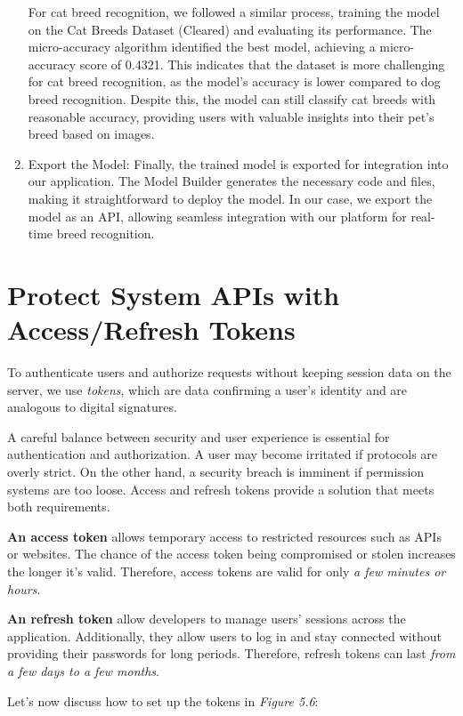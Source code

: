 \begin{enumerate}
    For cat breed recognition, we followed a similar process, training the model on the Cat Breeds Dataset (Cleared)
    and evaluating its performance. The micro-accuracy algorithm identified the best model, achieving a micro-accuracy
    score of 0.4321. This indicates that the dataset is more challenging for cat breed recognition, as the model's accuracy
    is lower compared to dog breed recognition. Despite this, the model can still classify cat breeds with reasonable accuracy,
    providing users with valuable insights into their pet's breed based on images. 

    \item Export the Model: Finally, the trained model is exported for integration into our application. 
    The Model Builder generates the necessary code and files, making it straightforward to deploy the model.
    In our case, we export the model as an API, allowing seamless integration with our platform for real-time breed recognition.
\end{enumerate}

\section{Protect System APIs with Access/Refresh Tokens}
To authenticate users and authorize requests without keeping session data on the server, we use \textit{tokens}, which are data confirming a user’s identity and are analogous to digital signatures.

A careful balance between security and user experience is essential for authentication and authorization. A user may become irritated if protocols are overly strict. On the other hand, a security breach is imminent if permission systems are too loose. Access and refresh tokens provide a solution that meets both requirements.

\textbf{An access token} allows temporary access to restricted resources such as APIs or websites. The chance of the access token being compromised or stolen increases the longer it’s valid. Therefore, access tokens are valid for only \textit{a few minutes or hours}.

\textbf{An refresh token} allow developers to manage users’ sessions across the application. Additionally, they allow users to log in and stay connected without providing their passwords for long periods. Therefore, refresh tokens can last \textit{from a few days to a few months}.

Let’s now discuss how to set up the tokens in \textit{Figure 5.6}:

